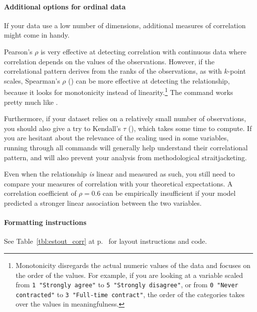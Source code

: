   \paragraph{Additional options for ordinal data} If your data use a low number of dimensions, additional measures of correlation might come in handy.

  Pearson's $\rho$ is very effective at detecting correlation with continuous data where correlation depends on the values of the observations. However, if the correlational pattern derives from the ranks of the observations, as with $k$-point scales, Spearman's $\rho$ () can be more effective at detecting the relationship, because it looks for monotonicity instead of linearity.\footnote{Monotonicity disregards the actual numeric values of the data and focuses on the order of the values. For example, if you are looking at a variable scaled from \texttt{1 "Strongly agree"} to \texttt{5 "Strongly disagree"}, or from \texttt{0 "Never contracted"} to \texttt{3 "Full-time contract"}, the order of the categories takes over the values in meaningfulness.} The command works pretty much like .

  Furthermore, if your dataset relies on a relatively small number of observations, you should also give a try to Kendall's $\tau$ (), which takes some time to compute. If you are hesitant about the relevance of the scaling used in some variables, running through all commands will generally help understand their correlational pattern, and will also prevent your analysis from methodological straitjacketing.

  Even when the relationship \emph{is} linear and measured as such, you still need to compare your measures of correlation with your theoretical expectations. A correlation coefficient of $\rho = 0.6$ can be empirically insufficient if your model predicted a stronger linear association between the two variables.

\paragraph{Formatting instructions} See Table~\ref{tbl:estout_corr} at p.~\pageref{tbl:estout_corr} for layout instructions and code.
